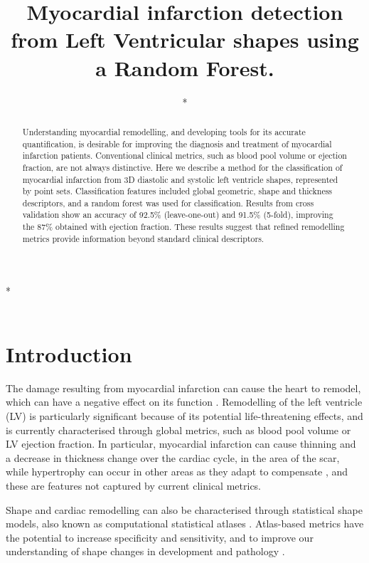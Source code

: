 \documentclass{llncs}
\begin{document}
\title{Myocardial infarction detection from Left Ventricular shapes using a Random Forest.}

\author{*}

\institute
{*\\
\email{*}\\
}
\maketitle              %
\begin{abstract}
Understanding myocardial remodelling, and developing tools for its accurate quantification, is desirable for improving the diagnosis and treatment of myocardial infarction patients. Conventional clinical metrics, such as blood pool volume or ejection fraction, are not always distinctive. Here we describe a method for the classification of myocardial infarction from 3D diastolic and systolic left ventricle shapes, represented by point sets. Classification features included global geometric, shape and thickness descriptors, and a random forest was used for classification. Results from cross validation show an accuracy of 92.5\% (leave-one-out) and 91.5\% (5-fold), improving the 87\% obtained with ejection fraction. These results suggest that refined remodelling metrics provide information beyond standard clinical descriptors.

\end{abstract}
%
\section{Introduction}
The damage resulting from myocardial infarction can cause the heart to remodel, which can have a negative effect on its function \cite{Sutton2000}. Remodelling of the left ventricle (LV) is particularly significant because of its potential life-threatening effects, and is currently characterised through global metrics, such as blood pool volume or LV ejection fraction. In particular, myocardial infarction can cause thinning and a decrease in thickness change over the cardiac cycle, in the area of the scar, while hypertrophy can occur in other areas as they adapt to compensate \cite{Sutton2000}, and these are features not captured by current clinical metrics. 

 

Shape and cardiac remodelling can also be characterised through statistical shape models, also known as computational statistical atlases \cite{Cootes1992,Young2009}. Atlas-based metrics have the potential to increase  specificity and sensitivity, and to improve our understanding of shape changes in development and pathology \cite{Lewandowski2012,Lorenz2006}. 
\end{document}
